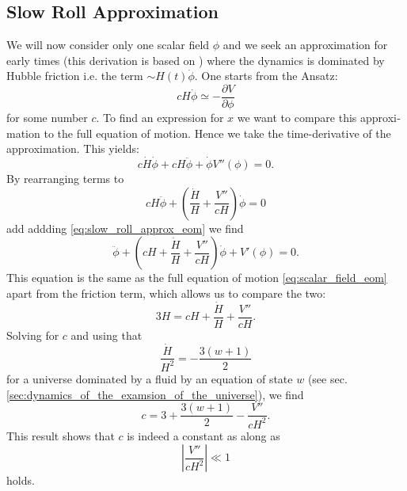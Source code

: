 \documentclass[master,       %
               twoside,        %
               BCOR10mm,       %
               english,ngerman, %
               ]{GAUBM}
\begin{document}
\begin{otherlanguage}{english}
\subsection{Slow Roll Approximation}
\label{sec:slow_roll_approximation}
We will now consider only one scalar field $\phi$ and we seek an approximation for early times (this derivation is based on \cite[appendix A]{early_scalar_field_dynamics_PhysRevD.84.123506}) where the dynamics is dominated by Hubble friction i.e. the term $\sim H(t) \dot{\phi}$.
One starts from the Ansatz:
\begin{equation}
	\label{eq:slow_roll_approx_eom}
	c H \dot{\phi} \simeq - \frac{\partial V}{\partial \phi}
\end{equation}
for some number $c$.
To find an expression for $x$ we want to compare this approximation to the full equation of motion. Hence we take the time-derivative of the approximation. This yields:
\begin{equation}
	c \dot{H} \dot{\phi} + c H \ddot{\phi} + \dot{\phi} V''(\phi) = 0.
\end{equation}
By rearranging terms to
\begin{equation}
	c H \ddot{\phi} + \left(\frac{\dot{H}}{H} + \frac{V''}{c H}\right) \dot{\phi} = 0
\end{equation}
add addding \eqref{eq:slow_roll_approx_eom} we find
\begin{equation}
	\ddot{\phi} + \left( cH + \frac{\dot{H}}{H} + \frac{V''}{c H} \right) \dot{\phi} + V'(\phi) = 0.
\end{equation}
This equation is the same as the full equation of motion \eqref{eq:scalar_field_eom} apart from the friction term,
which allows us to compare the two:
\begin{equation}
	3 H = c H + \frac{\dot{H}}{H} + \frac{V''}{c H}.
\end{equation}
Solving for $c$ and using that
\begin{equation}
	\frac{\dot{H}}{H^2} = - \frac{3(w + 1)}{2}
\end{equation}
for a universe dominated by a fluid by an equation of state $w$ (see sec. \ref{sec:dynamics_of_the_examsion_of_the_universe}), we find
\begin{equation}
	c = 3 +\frac{3(w + 1)}{2} - \frac{V''}{c H^2}.
\end{equation}
This result shows that $c$ is indeed a constant as along as
\begin{equation}
	\label{eq:slow_roll_condition}
	\left| \frac{V''}{c H^2} \right| \ll 1
\end{equation}
holds.


\end{otherlanguage}
\end{document}
